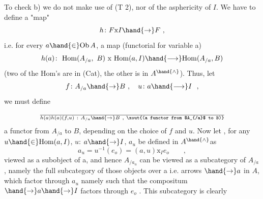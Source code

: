 To check b) we do not make use of  (T 2),  nor of the asphericity of
$I$.  We have to define a "map"
\[ h\colon F\mathrm{x}I\hand{\to} F\ , \]
i.e. for every $a\hand{\in}\mathrm{Ob}\,A$,  a map (functorial for variable a)
\[ h(a)\colon\ \mathrm{Hom}(A_{/a},\ B)\ \mathrm{x}\ \mathrm{Hom}(a,I)\hand{\longrightarrow} \mathrm{Hom}(A_{/a},B) \]
(two of the Hom's are in (Cat), the other is in $A^{\hand{\wedge}}$).  Thus,  let
\[ f\colon A_{/a}\hand{\to} B\ ,\quad u\colon a\hand{\longrightarrow} I\ \ , \]
we must define
\[ \over{h(a)}{h(a)}(f,u)\ :\ A_{/a}\hand{\to} B\ ,\ \xout{(a functor from $A_{/a}$ to B)} \]
a functor from $A_{/a}$ to $B$,  depending on the choice of $f$ and $u$.  Now let ,
for any  $u\hand{\in}\mathrm{Hom}(a,I)$,  $u$: $a\hand{\to} I$,  $a_u$ be defined in $A^{\hand{\wedge}}$\hand{/}as
\[ a_u = u^{-1}(e_o) = (a,u)\mathrm{x}_I e_o\qquad , \]
viewed as a subobject of a,  and hence $A_{/a_u}$  can be viewed as a subcategory
of $A_{/a}$ ,  namely the  full subcategory of those  objects  over a
i.e. arrows $\hand{\to} a$ in $A$,  which factor through $a_u$ namely such that the
compositum  $\hand{\to} a\hand{\to} I$  factors through $e_o$ .  This subcategory is clearly
